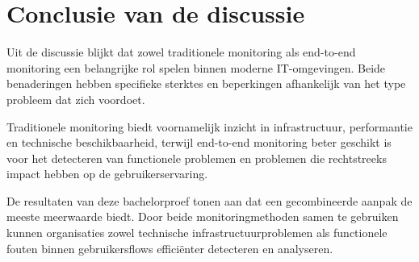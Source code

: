 \section{Conclusie van de discussie}

Uit de discussie blijkt dat zowel traditionele monitoring als end-to-end monitoring een belangrijke rol spelen binnen moderne IT-omgevingen. Beide benaderingen hebben specifieke sterktes en beperkingen afhankelijk van het type probleem dat zich voordoet.

Traditionele monitoring biedt voornamelijk inzicht in infrastructuur, performantie en technische beschikbaarheid, terwijl end-to-end monitoring beter geschikt is voor het detecteren van functionele problemen en problemen die rechtstreeks impact hebben op de gebruikerservaring.

De resultaten van deze bachelorproef tonen aan dat een gecombineerde aanpak de meeste meerwaarde biedt. Door beide monitoringmethoden samen te gebruiken kunnen organisaties zowel technische infrastructuurproblemen als functionele fouten binnen gebruikersflows efficiënter detecteren en analyseren.